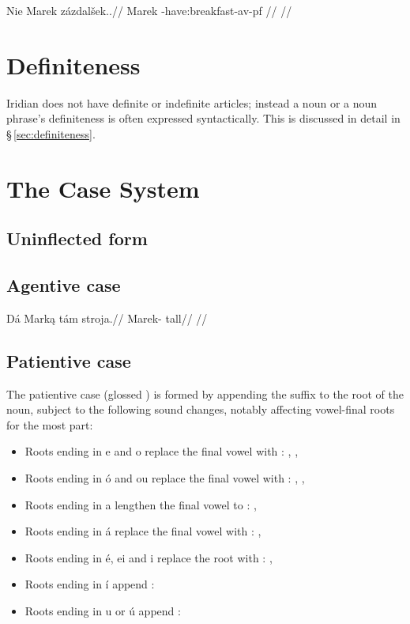 \pex
\begingl
    \gla Nie Marek zázdalšek..//
    \glb {} Marek -have:breakfast-{av-pf} //
    \glft {}//
\endgl
\xe


\section{Definiteness}
Iridian does not have definite or indefinite articles; instead a noun or a noun phrase's definiteness is often expressed syntactically. This is discussed in detail in \S\,\ref{sec:definiteness}.

\section{The Case System}


\subsection{Uninflected form}

\subsection{Agentive case}

\pex
\begingl
\gla Dá Mark\k{a} tám stroja.//
\glb {} Marek-  tall//
\glft {}//
\endgl
\xe

\subsection{Patientive case}

The patientive case (glossed ) is formed by appending the suffix  to the root of the noun, subject to the following sound changes, notably affecting vowel-final roots for the most part:

\begin{itemize}
	\item Roots ending in e and o replace the final vowel with :  ,  ,  
	\item Roots ending in \'o and ou replace the final vowel with :  ,  ,  
	\item Roots ending in a lengthen the final vowel to :  ,  
	\item Roots ending in á replace the final vowel with :  ,  
	\item Roots ending in é, ei and i replace the root with :  ,  
	\item Roots ending in í append :
	\item Roots ending in u or ú append :
\end{itemize}

